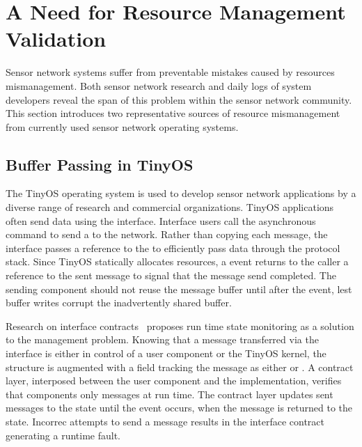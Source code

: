 \section{A Need for Resource Management Validation}
\label{sec:mot}

Sensor network systems suffer from preventable mistakes caused by resources
mismanagement.
%
Both sensor network research and daily logs of system developers reveal the
span of this problem within the sensor network community.
%
This section introduces two representative sources of resource mismanagement
from currently used sensor network operating systems.



\subsection{Buffer Passing in TinyOS}
\label{ssec:tinyos}


The TinyOS operating system is used to develop sensor network applications by
a diverse range of research and commercial organizations.
%
TinyOS applications often send data using the  interface.
%
Interface users call the asynchronous  command to send a
 to the network.
%
Rather than copying each message, the  interface passes a
reference to the  to efficiently pass data through the protocol
stack.
%
Since TinyOS statically allocates resources, a  event returns
to the caller a reference to the sent message to signal that the message send
completed.
%
The sending component should not reuse the message buffer until after the
 event, lest buffer writes corrupt the inadvertently shared
buffer.



Research on interface contracts~\cite{archer07interface} proposes run time
state monitoring as a solution to the management problem.
%
Knowing that a message transferred via the  interface is
either in control of a user component or the TinyOS kernel, the
 structure is augmented with a  field
tracking the message as either  or .
%
A contract layer, interposed between the user component and the
 implementation, verifies that components only 
 messages at run time.
%
The contract layer updates sent messages to the  state until
the  event occurs, when the message is returned to the
 state.
%
Incorrec attempts to send a  message results in the
interface contract generating a runtime fault.



